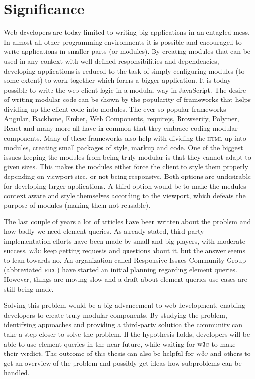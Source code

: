 \documentclass[oneside,a4paper,11pt]{kth-mag}
\begin{document}
\section{Significance}
Web developers are today limited to writing big applications in an entagled mess.
In almost all other programming environments it is possible and encouraged to write applications in smaller parts (or modules).
By creating modules that can be used in any context with well defined responsibilities and dependencies, developing applications is reduced to the task of simply configuring modules (to some extent) to work together which forms a bigger application.
It is today possible to write the web client logic in a modular way in JavaScript.
The desire of writing modular code can be shown by the popularity of frameworks that helps dividing up the client code into modules.
The ever so popular frameworks Angular, Backbone, Ember, Web Components, requirejs, Browserify, Polymer, React and many more all have in common that they embrace coding modular components.
Many of these frameworks also help with dividing the \textsc{html} up into modules, creating small packages of style, markup and code.
One of the biggest issues keeping the modules from being truly modular is that they cannot adapt to given sizes.
This makes the modules either force the client to style them properly depending on viewport size, or not being responsive.
Both options are undesirable for developing larger applications.
A third option would be to make the modules context aware and style themselves according to the viewport, which defeats the purpose of modules (making them not reusable).

The last couple of years a lot of articles have been written about the problem and how badly we need element queries.
As already stated, third-party implementation efforts have been made by small and big players, with moderate success.
\textsc{w3c} keep getting requests and questions about it, but the answer seems to lean towards no.
An organization called Responsive Issues Community Group (abbreviated \textsc{ricg}) have started an initial planning regarding element queries.
However, things are moving slow and a draft about element queries use cases are still being made.

Solving this problem would be a big advancement to web development, enabling developers to create truly modular components.
By studying the problem, identifying approaches and providing a third-party solution the community can take a step closer to solve the problem.
If the hypothesis holds, developers will be able to use element queries in the near future, while waiting for \textsc{w3c} to make their verdict.
The outcome of this thesis can also be helpful for \textsc{w3c} and others to get an overview of the problem and possibly get ideas how subproblems can be handled.
\end{document}
